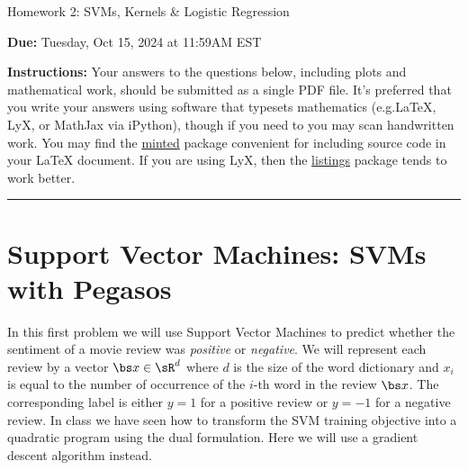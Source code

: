 \documentclass{article}
\newcommand{\wipcom}[1]{\textcolor{red}{WIP: #1}}
\newcommand{\ruleskip}{\bigskip\hrule\bigskip}
\theoremstyle{plain}
\theoremstyle{definition}
\begin{document}

\pagestyle{myheadings} 

\begin{center}
{\Large
Homework 2: SVMs, Kernels \& Logistic Regression
} 
\end{center}

{
{ \color{nyupurple} \textbf{Due:} Tuesday, Oct 15, 2024 at 11:59AM EST} 
} 

\textbf{Instructions: }Your answers to the questions below, including plots and mathematical
 work, should be submitted as a single PDF file.  It's preferred that you write your answers using software that typesets mathematics (e.g.LaTeX, LyX, or MathJax via iPython), though if you need to you may scan handwritten work.  You may find the \href{https://github.com/gpoore/minted}{minted} package convenient for including source code in your LaTeX document.  If you are using LyX, then the \href{https://en.wikibooks.org/wiki/LaTeX/Source_Code_Listings}{listings} package tends to work better.

\ruleskip


\section{\large Support Vector Machines: SVMs with Pegasos}

In this first problem we will use Support Vector Machines to predict whether the sentiment of a movie review was \emph{positive} or \emph{negative}. We will represent each review by a vector $\bs x \in \sR^d$ where $d$ is the size of the word dictionary and $x_i$ is equal to the number of occurrence of the $i$-th word in the review $\bs x$. The corresponding label is either $y=1$ for a positive review or $y=-1$ for a negative review.
In class we have seen how to transform the SVM training objective into a quadratic program using the dual formulation. Here we will use a gradient descent algorithm instead.
\end{document}
